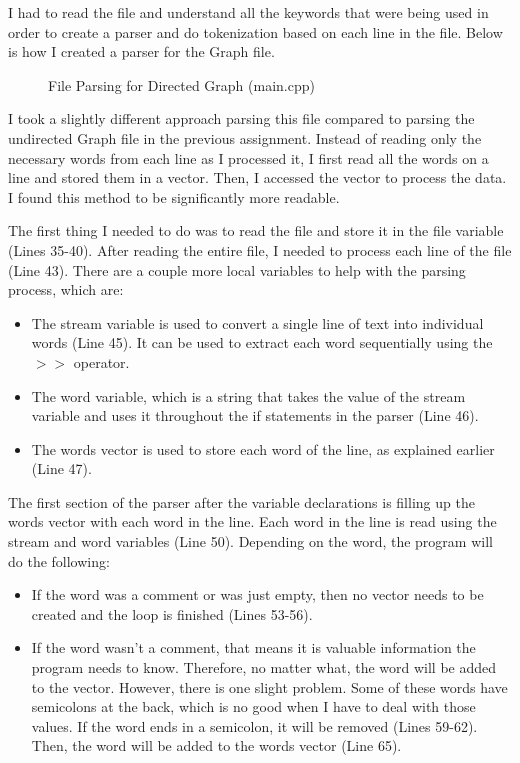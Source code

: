 \documentclass[letterpaper, 10pt]{article}
\begin{document}
\noindent
I had to read the file and understand all the keywords that were being used in order to create a parser and do tokenization based on each line in the file. Below is how I created a parser for the Graph file.

\begin{figure}[H]
  \centering
 
  \label{fig:figure2.2-part1}
\end{figure}

\begin{figure}[H]
  \centering
   
  \caption{File Parsing for Directed Graph (main.cpp)}
  \label{fig:figure2.2-part2}
\end{figure}

\noindent
I took a slightly different approach parsing this file compared to parsing the undirected Graph file in the previous assignment. Instead of reading only the necessary words from each line as I processed it, I first read all the words on a line and stored them in a vector. Then, I accessed the vector to process the data. I found this method to be significantly more readable.

\vspace{1em}
\noindent
The first thing I needed to do was to read the file and store it in the file variable (Lines 35-40). After reading the entire file, I needed to process each line of the file (Line 43). There are a couple more local variables to help with the parsing process, which are:
\begin{itemize}
    \item The stream variable is used to convert a single line of text into individual words (Line 45). It can be used to extract each word sequentially using the $>>$ operator.
    \item The word variable, which is a string that takes the value of the stream variable and uses it throughout the if statements in the parser (Line 46).
    \item The words vector is used to store each word of the line, as explained earlier (Line 47). 
\end{itemize}

\noindent
The first section of the parser after the variable declarations is filling up the words vector with each word in the line. Each word in the line is read using the stream and word variables (Line 50). Depending on the word, the program will do the following:
\begin{itemize}
    \item If the word was a comment or was just empty, then no vector needs to be created and the loop is finished (Lines 53-56).
    \item If the word wasn't a comment, that means it is valuable information the program needs to know. Therefore, no matter what, the word will be added to the vector. However, there is one slight problem. Some of these words have semicolons at the back, which is no good when I have to deal with those values. If the word ends in a semicolon, it will be removed (Lines 59-62). Then, the word will be added to the words vector (Line 65).
\end{itemize}
\end{document}
